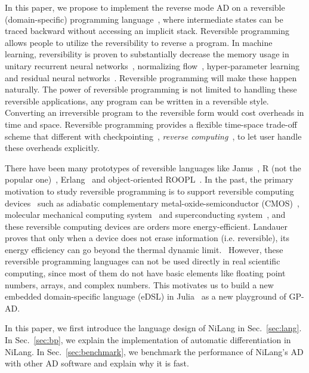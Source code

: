 \documentclass{article}
\newcommand{\<}{\langle}
\renewcommand{\>}{\rangle}
\renewcommand{\cite}[1]{{\citep{#1}}}
\newcommand{\Sec}[1]{Sec.~\ref{#1}}
\theoremstyle{definition}\newtheorem{definition}{\textit{Definition}}
\begin{document}
In this paper, we propose to implement the reverse mode AD on a reversible (domain-specific) programming language~\cite{Perumalla2013,Frank2017}, where intermediate states can be traced backward without accessing an implicit stack.
Reversible programming allows people to utilize the reversibility to reverse a program.
In machine learning, reversibility is proven to substantially decrease the memory usage in unitary recurrent neural networks~\cite{MacKay2018}, normalizing flow~\cite{Dinh2014}, hyper-parameter learning~\cite{Maclaurin2015} and residual neural networks~\cite{Gomez2017, Behrmann2018}.
Reversible programming will make these happen naturally.
The power of reversible programming is not limited to handling these reversible applications, any program can be written in a reversible style.
Converting an irreversible program to the reversible form would cost overheads in time and space.
Reversible programming provides a flexible time-space trade-off scheme that different with checkpointing~\cite{Griewank1992,Griewank2008, Chen2016}, \textit{reverse computing}~\cite{Bennett1989,Levine1990}, to let user handle these overheads explicitly.

There have been many prototypes of reversible languages like Janus~\cite{Lutz1986}, R (not the popular one)~\cite{Frank1997}, Erlang~\cite{Lanese2018} and object-oriented ROOPL~\cite{Haulund2017}.
In the past, the primary motivation to study reversible programming is to support reversible computing devices~\cite{Frank1999} such as adiabatic complementary metal-oxide-semiconductor (CMOS)~\cite{Koller1992}, molecular mechanical computing system~\cite{Merkle2018} and superconducting system~\cite{Likharev1977,Semenov2003,Takeuchi2014,Takeuchi2017}, and these reversible computing devices are orders more energy-efficient. Landauer proves that only when a device does not erase information (i.e. reversible), its energy efficiency can go beyond the thermal dynamic limit.~\cite{Landauer1961,Reeb2014}
However, these reversible programming languages can not be used directly in real scientific computing, since most of them do not have basic elements like floating point numbers, arrays, and complex numbers. This motivates us to build a new embedded domain-specific language (eDSL) in Julia~\cite{Bezanson2012,Bezanson2017} as a new playground of GP-AD.

    In this paper, we first introduce the language design of NiLang in \Sec{sec:lang}.
    In \Sec{sec:bp}, we explain the implementation of automatic differentiation in NiLang.
    In \Sec{sec:benchmark}, we benchmark the performance of NiLang's AD with other AD software and explain why it is fast.
\end{document}
